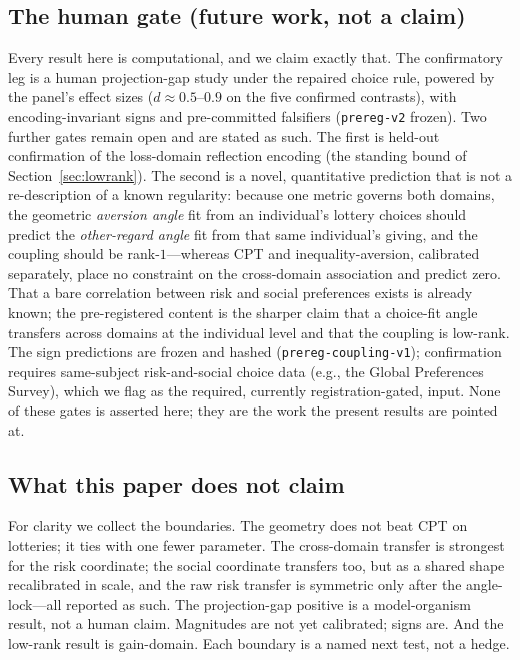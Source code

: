 \documentclass[journal]{IEEEtran}
\begin{document}
\subsection{The human gate (future work, not a claim)}
Every result here is computational, and we claim exactly that.
The confirmatory leg is a human projection-gap study under the repaired choice rule, powered by the panel's effect sizes ($d\approx0.5$--$0.9$ on the five confirmed contrasts), with encoding-invariant signs and pre-committed falsifiers (\texttt{prereg-v2} frozen).
Two further gates remain open and are stated as such.
The first is held-out confirmation of the loss-domain reflection encoding (the standing bound of Section~\ref{sec:lowrank}).
The second is a novel, quantitative prediction that is not a re-description of a known regularity: because one metric governs both domains, the geometric \emph{aversion angle} fit from an individual's lottery choices should predict the \emph{other-regard angle} fit from that same individual's giving, and the coupling should be rank-$1$---whereas CPT and inequality-aversion, calibrated separately, place no constraint on the cross-domain association and predict zero.
That a bare correlation between risk and social preferences exists is already known; the pre-registered content is the sharper claim that a choice-fit angle transfers across domains at the individual level and that the coupling is low-rank.
The sign predictions are frozen and hashed (\texttt{prereg-coupling-v1}); confirmation requires same-subject risk-and-social choice data (e.g., the Global Preferences Survey), which we flag as the required, currently registration-gated, input.
None of these gates is asserted here; they are the work the present results are pointed at.

\subsection{What this paper does not claim}
For clarity we collect the boundaries.
The geometry does not beat CPT on lotteries; it ties with one fewer parameter.
The cross-domain transfer is strongest for the risk coordinate; the social coordinate transfers too, but as a shared shape recalibrated in scale, and the raw risk transfer is symmetric only after the angle-lock---all reported as such.
The projection-gap positive is a model-organism result, not a human claim.
Magnitudes are not yet calibrated; signs are.
And the low-rank result is gain-domain.
Each boundary is a named next test, not a hedge.
\end{document}
